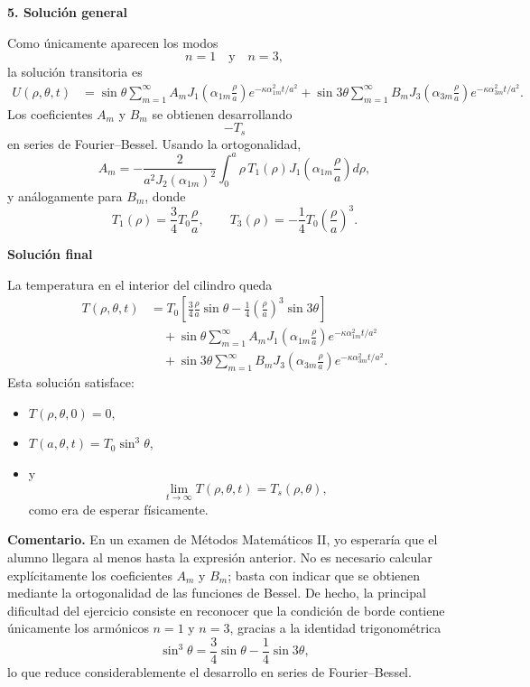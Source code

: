 \documentclass[11pt,spanish]{article}
\begin{document}
{\bf 5. Solución general}

Como únicamente aparecen los modos
$$
n=1
\quad\text{y}\quad
n=3,
$$
la solución transitoria es
$$
\boxed{
\begin{aligned}
U(\rho,\theta,t)
&=
\sin\theta
\sum_{m=1}^\infty
A_m
J_1
\left(
\alpha_{1m}\frac{\rho}{a}
\right)
e^{-\kappa\alpha_{1m}^2t/a^2}
+
\sin3\theta
\sum_{m=1}^\infty
B_m
J_3
\left(
\alpha_{3m}\frac{\rho}{a}
\right)
e^{-\kappa\alpha_{3m}^2t/a^2}.
\end{aligned}
}
$$
Los coeficientes $A_m$ y $B_m$ se obtienen desarrollando
$$
-T_s
$$
en series de Fourier–Bessel. Usando la ortogonalidad,
$$
A_m
=
-\frac{2}{a^2J_2(\alpha_{1m})^2}
\int_0^a
\rho\,T_1(\rho)
J_1
\left(
\alpha_{1m}\frac{\rho}{a}
\right)
d\rho,
$$
y análogamente para $B_m$, donde
$$
T_1(\rho)
=
\frac34T_0\frac{\rho}{a},
\qquad
T_3(\rho)
=
-\frac14T_0\left(\frac{\rho}{a}\right)^3.
$$

{\bf Solución final}

La temperatura en el interior del cilindro queda
$$
\boxed{
\begin{aligned}
T(\rho,\theta,t)
&=
T_0
\left[
\frac34
\frac{\rho}{a}
\sin\theta
-
\frac14
\left(\frac{\rho}{a}\right)^3
\sin3\theta
\right]
\\
&\quad
+
\sin\theta
\sum_{m=1}^{\infty}
A_m
J_1\left(\alpha_{1m}\frac{\rho}{a}\right)
e^{-\kappa\alpha_{1m}^2t/a^2}
\\
&\quad
+
\sin3\theta
\sum_{m=1}^{\infty}
B_m
J_3\left(\alpha_{3m}\frac{\rho}{a}\right)
e^{-\kappa\alpha_{3m}^2t/a^2}.
\end{aligned}
}
$$
Esta solución satisface:
\begin{itemize}
\item $T(\rho,\theta,0)=0$,
\item $T(a,\theta,t)=T_0\sin^3\theta$,
\item y
  $$
  \lim_{t\to\infty}T(\rho,\theta,t)=T_s(\rho,\theta),
  $$
  como era de esperar físicamente.
\end{itemize}

{\bf Comentario.} En un examen de Métodos Matemáticos II, yo esperaría que el alumno llegara al menos hasta la expresión anterior. No es necesario calcular explícitamente los coeficientes $A_m$ y $B_m$; basta con indicar que se obtienen mediante la ortogonalidad de las funciones de Bessel. De hecho, la principal dificultad del ejercicio consiste en reconocer que la condición de borde contiene únicamente los armónicos $n=1$ y $n=3$, gracias a la identidad trigonométrica
$$
\sin^3\theta=\frac34\sin\theta-\frac14\sin3\theta,
$$
lo que reduce considerablemente el desarrollo en series de Fourier–Bessel.



 
\end{document}
